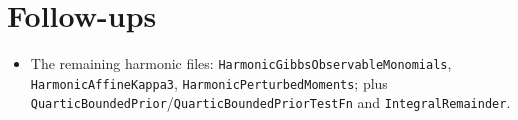 \documentclass[11pt]{article}
\begin{document}
\section{Follow-ups}
\begin{itemize}[noitemsep]
  \item The remaining harmonic files: \texttt{HarmonicGibbsObservableMonomials},
    \texttt{HarmonicAffineKappa3}, \texttt{HarmonicPerturbedMoments}; plus
    \texttt{QuarticBoundedPrior}/\texttt{QuarticBoundedPriorTestFn} and \texttt{IntegralRemainder}.
\end{itemize}
\end{document}
